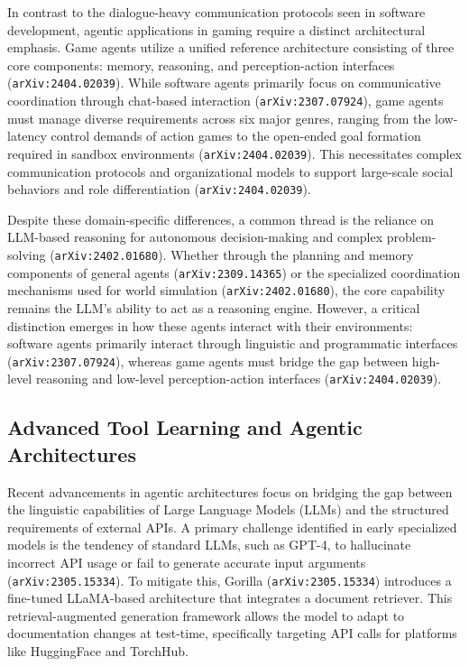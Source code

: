\documentclass[11pt]{article}
\begin{document}
In contrast to the dialogue-heavy communication protocols seen in software development, agentic applications in gaming require a distinct architectural emphasis. Game agents utilize a unified reference architecture consisting of three core components: memory, reasoning, and perception-action interfaces (\texttt{arXiv:2404.02039}). While software agents primarily focus on communicative coordination through chat-based interaction (\texttt{arXiv:2307.07924}), game agents must manage diverse requirements across six major genres, ranging from the low-latency control demands of action games to the open-ended goal formation required in sandbox environments (\texttt{arXiv:2404.02039}). This necessitates complex communication protocols and organizational models to support large-scale social behaviors and role differentiation (\texttt{arXiv:2404.02039}).

Despite these domain-specific differences, a common thread is the reliance on LLM-based reasoning for autonomous decision-making and complex problem-solving (\texttt{arXiv:2402.01680}). Whether through the planning and memory components of general agents (\texttt{arXiv:2309.14365}) or the specialized coordination mechanisms used for world simulation (\texttt{arXiv:2402.01680}), the core capability remains the LLM's ability to act as a reasoning engine. However, a critical distinction emerges in how these agents interact with their environments: software agents primarily interact through linguistic and programmatic interfaces (\texttt{arXiv:2307.07924}), whereas game agents must bridge the gap between high-level reasoning and low-level perception-action interfaces (\texttt{arXiv:2404.02039}).

\subsection{Advanced Tool Learning and Agentic Architectures}

Recent advancements in agentic architectures focus on bridging the gap between the linguistic capabilities of Large Language Models (LLMs) and the structured requirements of external APIs. A primary challenge identified in early specialized models is the tendency of standard LLMs, such as GPT-4, to hallucinate incorrect API usage or fail to generate accurate input arguments (\texttt{arXiv:2305.15334}). To mitigate this, Gorilla (\texttt{arXiv:2305.15334}) introduces a fine-tuned LLaMA-based architecture that integrates a document retriever. This retrieval-augmented generation framework allows the model to adapt to documentation changes at test-time, specifically targeting API calls for platforms like HuggingFace and TorchHub.
\end{document}
